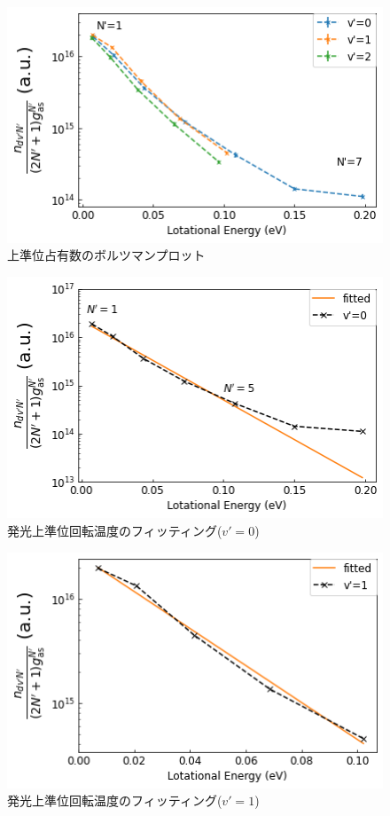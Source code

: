 \begin{figure}
    \centering
    \includegraphics[width=15cm]{pictures/upper-boltzmann-plot.png}
    \caption{上準位占有数のボルツマンプロット}
    \label{fig:upper-boltzmann-plot}
\end{figure}

\begin{figure}
    \centering
    \includegraphics[width=15cm]{pictures/upper-fitting-0.png}
    \caption{発光上準位回転温度のフィッティング($v'=0$)}
    \label{fig:upper-fitting-0}
\end{figure}

\begin{figure}
    \centering
    \includegraphics[width=15cm]{pictures/upper-fitting-1.png}
    \caption{発光上準位回転温度のフィッティング($v'=1$)}
    \label{fig:upper-fitting-1}
\end{figure}

